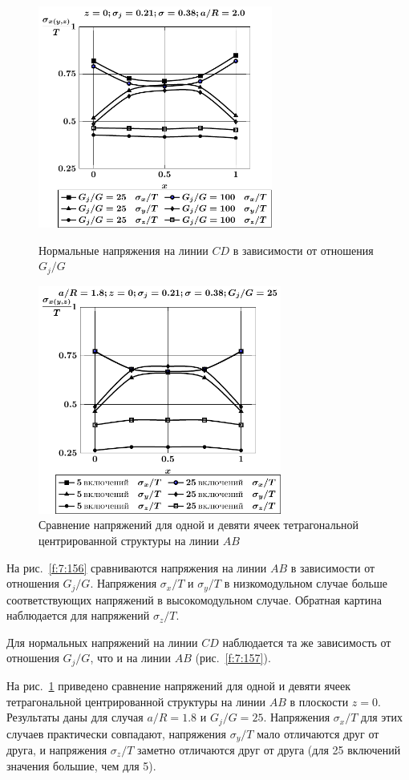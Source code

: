 \begin{figure}[h!]
\centering\footnotesize
\parbox[b]{7.5cm}{\centering\includegraphics[width=7.7cm]{inc25-g-a20-h10-r10-z0-cd.pdf}
\caption{Нормальные напряжения на линии $CD$ в зависимости от отношения $G_j/G$
\label{f:7:157}}}\hfil\hfil
\parbox[b]{7.5cm}{\centering\includegraphics[width=8cm]{inc25-5-a18-h10-r10-g25-z0-ab.pdf}
\caption{Сравнение напряжений для одной и девяти ячеек тетрагональной центрированной структуры на линии $AB$
\label{f:7:158}}}
\end{figure}

На рис.~\ref{f:7:156} сравниваются напряжения на линии $AB$ в зависимости от отношения $G_j/G$. Напряжения $\sigma_x/T$ и $\sigma_y/T$ в низкомодульном случае больше соответствующих напряжений в высокомодульном случае. Обратная картина наблюдается для напряжений $\sigma_z/T$.

Для нормальных напряжений на линии $CD$ наблюдается та же зависимость от отношения $G_j/G$, что и на линии $AB$ (рис.~\ref{f:7:157}).

На рис.~\ref{f:7:158} приведено сравнение напряжений для одной и девяти ячеек тетрагональной центрированной структуры на линии $AB$ в плоскости $z=0$. Результаты даны для случая $a/R=1.8$ и $G_j/G=25$. Напряжения $\sigma_x/T$ для этих случаев практически совпадают, напряжения $\sigma_y/T$ мало отличаются друг от друга, и напряжения $\sigma_z/T$ заметно отличаются друг от друга (для 25 включений значения большие, чем для 5).

